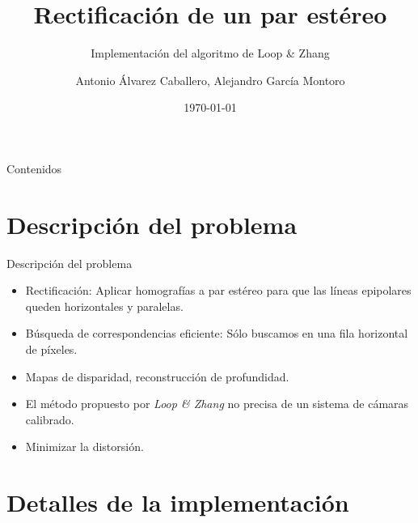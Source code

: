 \documentclass[aspectratio=169,14pt,spanish]{beamer}
\title[Rectificación]{Rectificación de un par estéreo}
\subtitle[Implementación de Loop Zhang]{Implementación del algoritmo de Loop \& Zhang}
\author[A. A. Caballero, A. G. Montoro]{Antonio Álvarez Caballero, Alejandro García Montoro}
\institute[UGR]{Universidad de Granada}
\date{\today}
\begin{document}
    \titlepage

    \begin{frame}[t]{Contenidos}
        \tableofcontents
    \end{frame}

    \section{Descripción del problema}

    \begin{frame}{Descripción del problema}{}

        \begin{itemize}[<+->]
            \item Rectificación: Aplicar homografías a par estéreo para que las líneas
              epipolares queden horizontales y paralelas.
            \item Búsqueda de correspondencias eficiente: Sólo buscamos en una fila
              horizontal de píxeles.
            \item Mapas de disparidad, reconstrucción de profundidad.
            \item El método propuesto por \emph{Loop \& Zhang} no precisa de un sistema
              de cámaras calibrado.
            \item Minimizar la distorsión.
        \end{itemize}

    \end{frame}

    \section{Detalles de la implementación}
\end{document}

